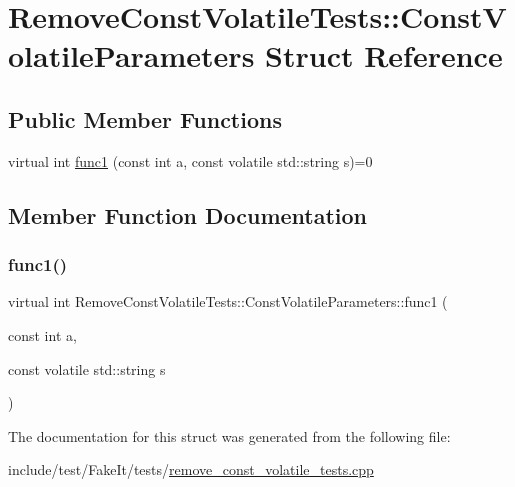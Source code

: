 \hypertarget{structRemoveConstVolatileTests_1_1ConstVolatileParameters}{}\section{Remove\+Const\+Volatile\+Tests\+::Const\+Volatile\+Parameters Struct Reference}
\label{structRemoveConstVolatileTests_1_1ConstVolatileParameters}
\subsection*{Public Member Functions}
\begin{DoxyCompactItemize}
\item 
virtual int \mbox{\hyperlink{structRemoveConstVolatileTests_1_1ConstVolatileParameters_a0fad6680ee04047cd9b40056c0244202}{func1}} (const int a, const volatile std\+::string s)=0
\end{DoxyCompactItemize}


\subsection{Member Function Documentation}
\mbox{\label{structRemoveConstVolatileTests_1_1ConstVolatileParameters_a0fad6680ee04047cd9b40056c0244202}} 
\subsubsection{\texorpdfstring{func1()}{func1()}}
{\footnotesize\ttfamily virtual int Remove\+Const\+Volatile\+Tests\+::\+Const\+Volatile\+Parameters\+::func1 (\begin{DoxyParamCaption}\item[{const int}]{a,  }\item[{const volatile std\+::string}]{s }\end{DoxyParamCaption})\hspace{0.3cm}{\ttfamily [pure virtual]}}



The documentation for this struct was generated from the following file\+:\begin{DoxyCompactItemize}
\item 
include/test/\+Fake\+It/tests/\mbox{\hyperlink{remove__const__volatile__tests_8cpp}{remove\+\_\+const\+\_\+volatile\+\_\+tests.\+cpp}}\end{DoxyCompactItemize}
